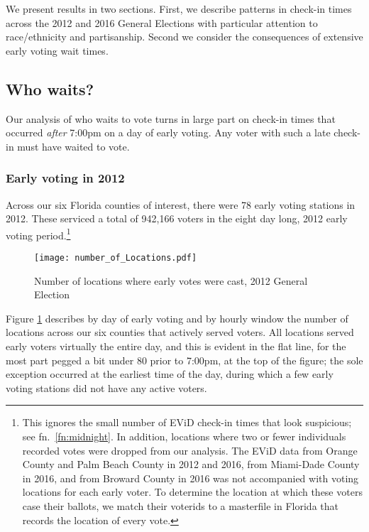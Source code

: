 \documentclass[12pt,titlepage]{article}
\begin{document}
We present results in two sections.  First, we describe patterns in
check-in times across the 2012 and 2016 General Elections with
particular attention to race/ethnicity and partisanship.  Second we
consider the consequences of extensive early voting wait times.


\subsection*{Who waits?}

Our analysis of who waits to vote turns in large part on check-in
times that occurred \emph{after} 7:00pm on a day of early voting.  Any
voter with such a late check-in must have waited to vote.

\subsubsection*{Early voting in 2012}

Across our six Florida counties of interest, there were 78 early
voting stations in 2012.  These serviced a total of 942,166 voters in
the eight day long, 2012 early voting period.\footnote{This ignores
  the small number of EViD check-in times that look suspicious; see
  fn.\ \ref{fn:midnight}.  In addition, locations where two or fewer
  individuals recorded votes were dropped from our analysis.  The EViD
  data from Orange County and Palm Beach County in 2012 and 2016, from
  Miami-Dade County in 2016, and from Broward County in 2016 was not
  accompanied with voting locations for each early voter.  To
  determine the location at which these voters case their ballots, we
  match their voterids to a masterfile in Florida that records the
  location of every vote.}  %



\begin{figure}[!ht]
  \caption{Number of locations where early votes were cast, 2012
    General Election}
  \label{fig:nrlocs2012}
  \centering
    \centering\texttt{[image: number\_of\_Locations.pdf]}
\end{figure}

Figure \ref{fig:nrlocs2012} describes by day of early voting and by
hourly window the number of locations across our six counties that
actively served voters.  All locations served early voters virtually
the entire day, and this is evident in the flat line, for the most
part pegged a bit under 80 prior to 7:00pm, at the top of the figure;
the sole exception occurred at the earliest time of the day, during
which a few early voting stations did not have any active voters.
\end{document}
